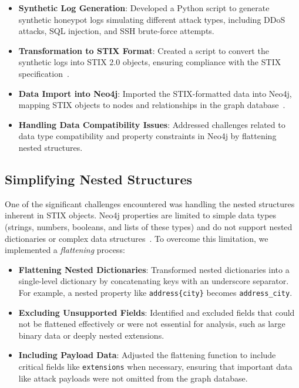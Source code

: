 \documentclass[conference]{IEEEtran}
\begin{document}
\begin{itemize}
    \item \textbf{Synthetic Log Generation}: Developed a Python script to generate synthetic honeypot logs simulating different attack types, including DDoS attacks, SQL injection, and SSH brute-force attempts.
    \item \textbf{Transformation to STIX Format}: Created a script to convert the synthetic logs into STIX 2.0 objects, ensuring compliance with the STIX specification~\cite{stix2017core}.
    \item \textbf{Data Import into Neo4j}: Imported the STIX-formatted data into Neo4j, mapping STIX objects to nodes and relationships in the graph database~\cite{webber2012graph}.
    \item \textbf{Handling Data Compatibility Issues}: Addressed challenges related to data type compatibility and property constraints in Neo4j by flattening nested structures.
\end{itemize}

\subsection{Simplifying Nested Structures}

One of the significant challenges encountered was handling the nested structures inherent in STIX objects. Neo4j properties are limited to simple data types (strings, numbers, booleans, and lists of these types) and do not support nested dictionaries or complex data structures~\cite{neo4j}. To overcome this limitation, we implemented a \textit{flattening} process:

\begin{itemize}
    \item \textbf{Flattening Nested Dictionaries}: Transformed nested dictionaries into a single-level dictionary by concatenating keys with an underscore separator. For example, a nested property like \texttt{address\{city\}} becomes \texttt{address\_city}.
    \item \textbf{Excluding Unsupported Fields}: Identified and excluded fields that could not be flattened effectively or were not essential for analysis, such as large binary data or deeply nested extensions.
    \item \textbf{Including Payload Data}: Adjusted the flattening function to include critical fields like \texttt{extensions} when necessary, ensuring that important data like attack payloads were not omitted from the graph database.
\end{itemize}
\end{document}
